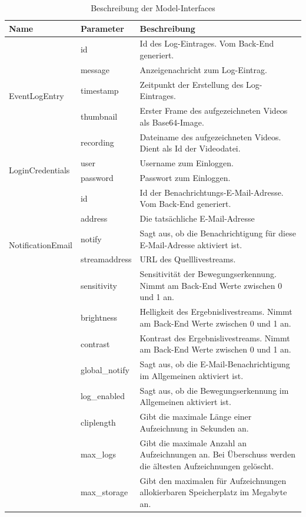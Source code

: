 \begin{table}[]
	\begin{tabular}{|p{}|p{}|p{}|}
		\hline
		
		\cline{1-3}
		\textbf{Name} & \textbf{Parameter} & \textbf{Beschreibung} \\ \hline    
		
		\multirow{5}{*}{EventLogEntry} & id & Id des Log-Eintrages. Vom Back-End generiert. \\ \cline{2-3} 
		& message & Anzeigenachricht zum Log-Eintrag. \\ \cline{2-3} 
		& timestamp & Zeitpunkt der Erstellung des Log-Eintrages. \\ \cline{2-3} 
		& thumbnail & Erster Frame des aufgezeichneten Videos als Base64-Image.\\ \cline{2-3} 
		& recording & Dateiname des aufgezeichneten Videos. Dient als Id der Videodatei. \\ \hline
		
		\multirow{2}{*}{LoginCredentials} & user & Username zum Einloggen. \\ \cline{2-3} 
		& password & Passwort zum Einloggen. \\ \hline
		
		\multirow{5}{*}{NotificationEmail} & id & Id der Benachrichtungs-E-Mail-Adresse. Vom Back-End generiert. \\ \cline{2-3} 
		& address & Die tatsächliche E-Mail-Adresse \\ \cline{2-3}
		& notify & Sagt aus, ob die Benachrichtigung für diese E-Mail-Adresse aktiviert ist. \\ \hline
		
		\multirow{5}{*}{Settings} & streamaddress & \acs{URL} des Quelllivestreams. \\ \cline{2-3} 
		& sensitivity & Sensitivität der Bewegungserkennung. Nimmt am Back-End Werte zwischen 0 und 1 an. \\ \cline{2-3} 
		& brightness & Helligkeit des Ergebnislivestreams. Nimmt am Back-End Werte zwischen 0 und 1 an. \\ \cline{2-3} 
		& contrast & Kontrast des Ergebnislivestreams. Nimmt am Back-End Werte zwischen 0 und 1 an. \\ \cline{2-3} 
		& global\_notify & Sagt aus, ob die E-Mail-Benachrichtigung im Allgemeinen aktiviert ist. \\ \cline{2-3}
		& log\_enabled & Sagt aus, ob die Bewegungserkennung im Allgemeinen aktiviert ist. \\ \cline{2-3}
		& cliplength & Gibt die maximale Länge einer Aufzeichnung in Sekunden an. \\ \cline{2-3}
		& max\_logs & Gibt die maximale Anzahl an Aufzeichnungen an. Bei Überschuss werden die ältesten Aufzeichnungen gelöscht. \\ \cline{2-3}
		& max\_storage & Gibt den maximalen für Aufzeichnungen allokierbaren Speicherplatz im Megabyte an. \\ \hline
		
	\end{tabular}
	\caption{Beschreibung der Model-Interfaces}
	\label{tab:model_interfaces}
\end{table}

